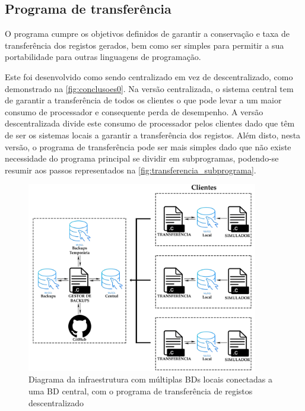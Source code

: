 \documentclass[11pt,twoside,a4paper]{report}
\begin{document}
\subsection{Programa de transferência}
O programa cumpre os objetivos definidos de garantir a conservação e taxa de transferência dos registos gerados, bem como ser simples para permitir a sua portabilidade para outras linguagens de programação.\par
Este foi desenvolvido como sendo centralizado em vez de descentralizado, como demonstrado na \autoref{fig:conclusoes0}. 
Na versão centralizada, o sistema central tem de garantir a transferência de todos os clientes o que pode levar a um maior consumo de processador e consequente perda de desempenho. A versão descentralizada divide este consumo de processador pelos clientes dado que têm de ser os sistemas locais a garantir a transferência dos registos. Além disto, nesta versão, o programa de transferência pode ser mais simples dado que não existe necessidade do programa principal se dividir em subprogramas, podendo-se resumir aos passos representados na \autoref{fig:transferencia_subprograma}.
\begin{figure}[H]
	\begin{center}
		\includegraphics[width=0.9\textwidth]{Esquema_Projeto_Descentralizado} %
		\caption{Diagrama da infraestrutura com múltiplas BDs locais conectadas a uma BD central, com o programa de transferência de registos descentralizado}
		\label{fig:conclusoes0}
	\end{center}
\end{figure}
\end{document}

